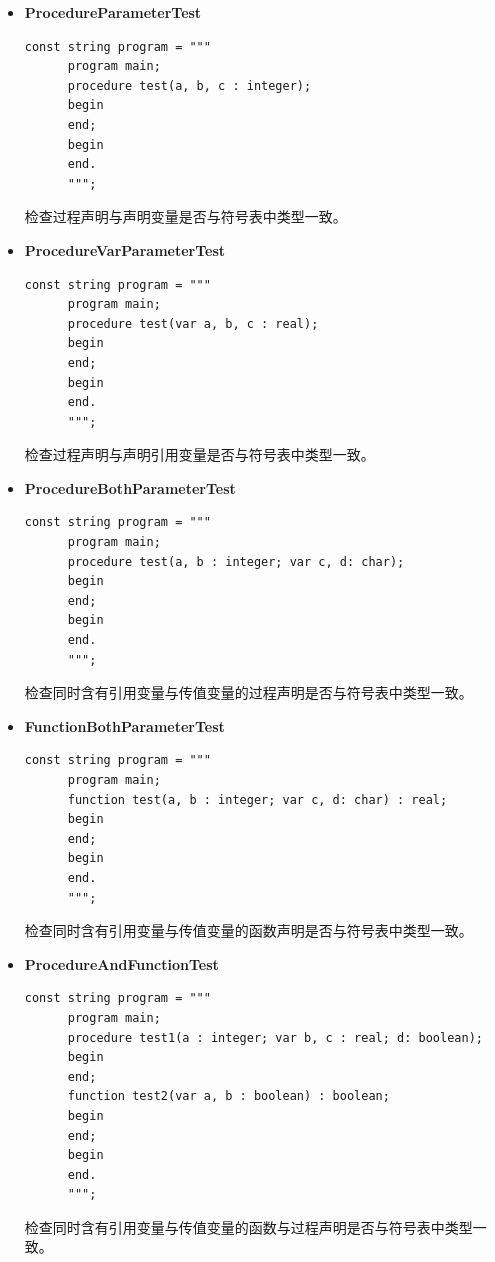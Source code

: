 \documentclass[../main.tex]{subfiles}
\begin{document}
\begin{itemize}
    \item \textbf{ProcedureParameterTest}
    \begin{lstlisting}[style=csharp]
const string program = """
      program main;
      procedure test(a, b, c : integer);
      begin
      end;
      begin
      end.
      """;        
    \end{lstlisting}

检查过程声明与声明变量是否与符号表中类型一致。

    \item \textbf{ProcedureVarParameterTest}
    \begin{lstlisting}[style=csharp]
const string program = """
      program main;
      procedure test(var a, b, c : real);
      begin
      end;
      begin
      end.
      """;
    \end{lstlisting}

检查过程声明与声明引用变量是否与符号表中类型一致。

    \item \textbf{ProcedureBothParameterTest}
    \begin{lstlisting}[style=csharp]
const string program = """
      program main;
      procedure test(a, b : integer; var c, d: char);
      begin
      end;
      begin
      end.
      """;        
    \end{lstlisting}

检查同时含有引用变量与传值变量的过程声明是否与符号表中类型一致。

    \item \textbf{FunctionBothParameterTest}
    \begin{lstlisting}[style=csharp]
const string program = """
      program main;
      function test(a, b : integer; var c, d: char) : real;
      begin
      end;
      begin
      end.
      """;        
    \end{lstlisting}

检查同时含有引用变量与传值变量的函数声明是否与符号表中类型一致。

    \item \textbf{ProcedureAndFunctionTest}
    \begin{lstlisting}[style=csharp]
const string program = """
      program main;
      procedure test1(a : integer; var b, c : real; d: boolean);
      begin
      end;
      function test2(var a, b : boolean) : boolean;
      begin
      end;
      begin
      end.
      """;
    \end{lstlisting}

检查同时含有引用变量与传值变量的函数与过程声明是否与符号表中类型一致。


\end{itemize}
\end{document}
